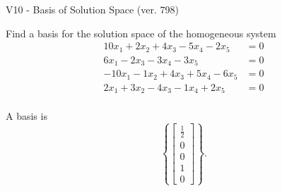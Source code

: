 \begin{exercise}
  \begin{exerciseTitle}V10 - Basis of Solution Space (ver. 798)\end{exerciseTitle}
  \begin{exerciseStatement}
    Find a basis for the solution space of the homogeneous system 
\begin{align*}
 10 x_ 1 + 2 x_ 2 + 4 x_ 3 -5 x_ 4 -2 x_ 5 &= 0  \\ 
  6 x_ 1 -2 x_ 3 -3 x_ 4 -3 x_ 5 &= 0  \\ 
  -10 x_ 1 -1 x_ 2 + 4 x_ 3 + 5 x_ 4 -6 x_ 5 &= 0  \\ 
  2 x_ 1 + 3 x_ 2 -4 x_ 3 -1 x_ 4 + 2 x_ 5 &= 0  \\ 
 \end{align*}


 
  \end{exerciseStatement}

  \begin{exerciseAnswer}
   A basis is   
\[\left\{\left[\begin{array}{c}
\frac{1}{2} \\
0 \\
0 \\
1 \\
0
\end{array}\right]\right\}.\]

  


  \end{exerciseAnswer}
\end{exercise}